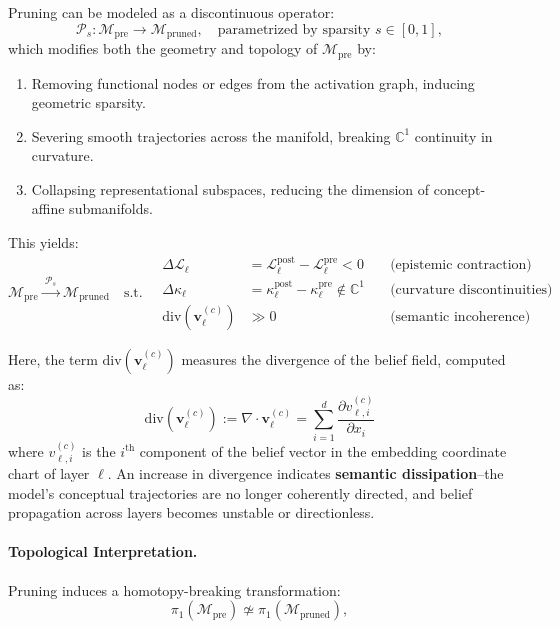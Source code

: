 Pruning can be modeled as a discontinuous operator:
\[
\mathcal{P}_s: \mathcal{M}_{\text{pre}} \longrightarrow \mathcal{M}_{\text{pruned}}, \quad \text{parametrized by sparsity } s \in [0,1],
\]
which modifies both the geometry and topology of $\mathcal{M}_{\text{pre}}$ by:
\begin{enumerate}[label=(\roman*), leftmargin=1.5em]
    \item Removing functional nodes or edges from the activation graph, inducing geometric sparsity.
    \item Severing smooth trajectories across the manifold, breaking $\mathbb{C}^1$ continuity in curvature.
    \item Collapsing representational subspaces, reducing the dimension of concept-affine submanifolds.
\end{enumerate}

This yields:
\[
\boxed{
\mathcal{M}_{\text{pre}} \xrightarrow{\;\mathcal{P}_s\;} \mathcal{M}_{\text{pruned}} \quad \text{s.t.} \quad
\begin{aligned}
\Delta \mathcal{L}_\ell &= \mathcal{L}_\ell^{\text{post}} - \mathcal{L}_\ell^{\text{pre}} < 0 \quad &\text{(epistemic contraction)} \\
\Delta \kappa_\ell &= \kappa_\ell^{\text{post}} - \kappa_\ell^{\text{pre}} \notin \mathbb{C}^1 \quad &\text{(curvature discontinuities)} \\
\mathrm{div}(\mathbf{v}_\ell^{(c)}) &\gg 0 \quad &\text{(semantic incoherence)}
\end{aligned}
}
\]

\noindent Here, the term $\mathrm{div}(\mathbf{v}_\ell^{(c)})$ measures the divergence of the belief field, computed as:
\[
\mathrm{div}(\mathbf{v}_\ell^{(c)}) := \nabla \cdot \mathbf{v}_\ell^{(c)} = \sum_{i=1}^d \frac{\partial v_{\ell,i}^{(c)}}{\partial x_i}
\]
where $v_{\ell,i}^{(c)}$ is the $i^{\text{th}}$ component of the belief vector in the embedding coordinate chart of layer $\ell$. An increase in divergence indicates \textbf{semantic dissipation}--the model’s conceptual trajectories are no longer coherently directed, and belief propagation across layers becomes unstable or directionless.

\paragraph{Topological Interpretation.}
Pruning induces a homotopy-breaking transformation:
\[
\pi_1(\mathcal{M}_{\text{pre}}) \not\simeq \pi_1(\mathcal{M}_{\text{pruned}}),
\]

